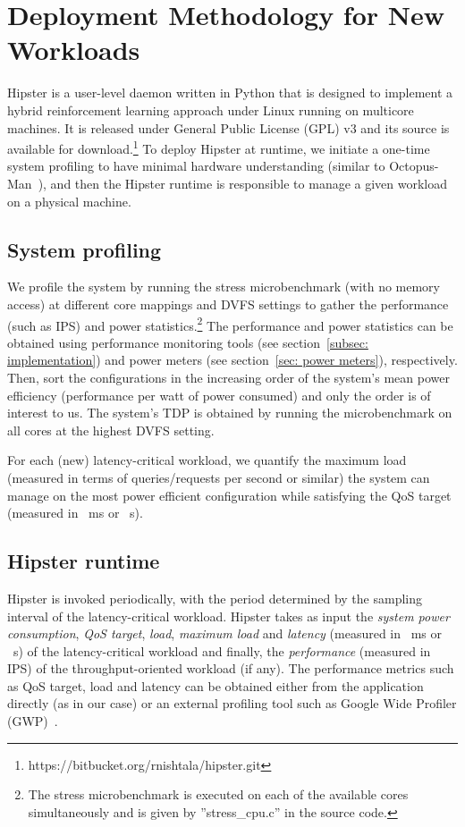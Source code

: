 \section{Deployment Methodology for New Workloads} 
\label{sec: set hipster} 

 Hipster is a user-level daemon written in Python that is designed to
implement a hybrid reinforcement learning approach under Linux running on multicore
machines. It is released under General Public License (GPL) v3 and its source is available
for download.\footnote{https://bitbucket.org/rnishtala/hipster.git} To deploy Hipster at
runtime, we initiate a one-time system profiling to have minimal hardware understanding (similar
to Octopus-Man~\citep{Petrucci2015Octopus-Man:Computers}), and then the Hipster runtime is
responsible to manage a given workload on a physical machine. 

\subsection{System profiling} We profile the system by running the
stress microbenchmark (with no memory access) at different core mappings and DVFS settings
to gather the performance (such as IPS) and power statistics.\footnote{The stress
microbenchmark is executed on each of the available cores simultaneously and is given by ''stress\_cpu.c'' in the source code.} The performance and power
statistics can be obtained using performance monitoring tools (see section~\ref{subsec:
implementation}) and power meters (see section~\ref{sec: power meters}), respectively.
Then, sort the configurations in the increasing order of the system's mean power
efficiency (performance per watt of power consumed) and only the order is of interest to
us. The system's TDP is obtained by running the microbenchmark on all cores at the highest
DVFS setting. 

For each (new) latency-critical workload, we quantify the maximum load (measured in terms
of queries/requests per second or similar) the system can manage on the most
power efficient configuration while satisfying the QoS target (measured in
\SI{}{\milli\second} or \SI{}{\second}).

\vspace{1mm}

\subsection{Hipster runtime} Hipster is invoked periodically, with the period determined by
the sampling interval of the latency-critical workload. Hipster takes as input the
\textit{system power consumption}, \textit{QoS target}, \textit{load}, \textit{maximum
load} and \textit{latency} (measured in \SI{}{\milli\second} or \SI{}{\second}) of the
latency-critical workload and finally, the \textit{performance} (measured in IPS) of the
throughput-oriented workload (if any). The performance metrics such as QoS target, load and
latency can be obtained either from the application directly (as in our case) or an external profiling tool
such as Google Wide Profiler (GWP)~\citep{Ren2010Google-WideCenters}.

